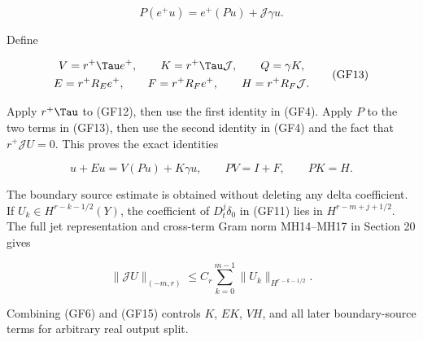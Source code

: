 \documentclass[
  11pt,
]{article}
\makeatletter
\let\ReaderOriginalAnchorStart\hyper@anchorstart
\let\ReaderOriginalAnchorEnd\hyper@anchorend
\let\ReaderPendingAliases\@empty
\def\ReaderArmAliases#1{\gdef\ReaderPendingAliases{#1}}
\def\hyper@anchorstart#1{\ReaderIfNativeAnchorTF{#1}{\ReaderPendingAliases\global\let\ReaderPendingAliases\@empty}{}\ReaderOriginalAnchorStart{#1}}
\makeatother
\begin{document}
\[
 P(e^+u)=e^+(Pu)+\mathcal J\gamma u.
 \tag{GF12}
\]

Define

\[
 \begin{gathered}
 V=r^+\Tau e^+,
 \qquad K=r^+\Tau\mathcal J,
 \qquad Q=\gamma K,\\
 E=r^+R_Ee^+,
 \qquad F=r^+R_Fe^+,
 \qquad H=r^+R_F\mathcal J.
 \end{gathered}
 \tag{GF13}
\]

Apply \(r^+\Tau\) to (GF12), then use the first identity in (GF4). Apply
\(P\) to the two terms in (GF13), then use the second identity in (GF4)
and the fact that \(r^+\mathcal JU=0\). This proves the exact identities

\[
 u+Eu=V(Pu)+K\gamma u,
 \qquad
 PV=I+F,
 \qquad
 PK=H.
 \tag{GF14}
\]

The boundary source estimate is obtained without deleting any delta
coefficient. If \(U_k\in H^{r-k-1/2}(Y)\), the coefficient of
\(D_t^j\delta_0\) in (GF11) lies in \(H^{r-m+j+1/2}\). The full jet
representation and cross-term Gram norm MH14--MH17 in Section 20 gives

\[
 \|\mathcal JU\|_{(-m,r)}
 \leq C_r\sum_{k=0}^{m-1}\|U_k\|_{H^{r-k-1/2}}.
 \tag{GF15}
\]

Combining (GF6) and (GF15) controls \(K\), \(E K\), \(V H\), and all
later boundary-source terms for arbitrary real output split.

\ReaderArmAliases{\ReaderOriginalAnchorStart{AN03-GCF-004}\ReaderOriginalAnchorEnd\begingroup\expandafter\def\csname @currentHref\endcsname{AN03-GCF-004}\label{AN03-GCF-004}\endgroup\ReaderOriginalAnchorStart{4-the-generalized-calder-n-matrix}\ReaderOriginalAnchorEnd\begingroup\expandafter\def\csname @currentHref\endcsname{4-the-generalized-calder-n-matrix}\label{4-the-generalized-calder-n-matrix}\endgroup\pdfextension dest name{\string\376\string\377\string\000\string\164\string\000\string\150\string\000\string\145\string\000\string\055\string\000\string\147\string\000\string\145\string\000\string\156\string\000\string\145\string\000\string\162\string\000\string\141\string\000\string\154\string\000\string\151\string\000\string\172\string\000\string\145\string\000\string\144\string\000\string\055\string\000\string\143\string\000\string\141\string\000\string\154\string\000\string\144\string\000\string\145\string\000\string\162\string\000\string\363\string\000\string\156\string\000\string\055\string\000\string\155\string\000\string\141\string\000\string\164\string\000\string\162\string\000\string\151\string\000\string\170} xyz\relax\begingroup\expandafter\def\csname @currentHref\endcsname{the-generalized-calderón-matrix}\label{the-generalized-calderón-matrix}\endgroup}
\end{document}
